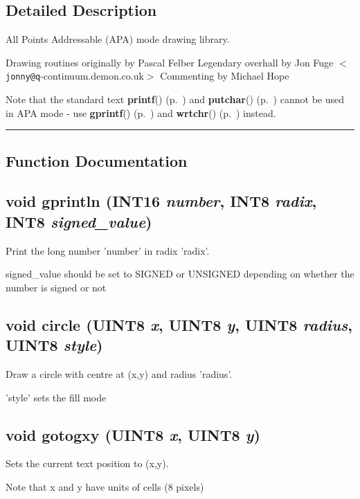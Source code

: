 \subsection*{Detailed Description}
All Points Addressable (APA) mode drawing library.

Drawing routines originally by Pascal Felber Legendary overhall by Jon Fuge $<${\tt jonny@q}-continuum.demon.co.uk$>$ Commenting by Michael Hope

Note that the standard text {\bf printf}() {\rm (p.~\pageref{stdio.h_a1})} and {\bf putchar}() {\rm (p.~\pageref{stdio.h_a0})} cannot be used in APA mode - use {\bf gprintf}() {\rm (p.~\pageref{drawing.h_a17})} and {\bf wrtchr}() {\rm (p.~\pageref{drawing.h_a26})} instead. \vspace{0.4cm}\hrule\vspace{0.2cm}
\subsection*{Function Documentation}
\label{drawing.h_a15}
\subsection{\setlength{\rightskip}{0pt plus 5cm}void gprintln ({\bf INT16} {\em number}, {\bf INT8} {\em radix}, {\bf INT8} {\em signed\_\-value})}

Print the long number 'number' in radix 'radix'.

signed\_\-value should be set to SIGNED or UNSIGNED depending on whether the number is signed or not \label{drawing.h_a24}
\subsection{\setlength{\rightskip}{0pt plus 5cm}void circle ({\bf UINT8} {\em x}, {\bf UINT8} {\em y}, {\bf UINT8} {\em radius}, {\bf UINT8} {\em style})}

Draw a circle with centre at (x,y) and radius 'radius'.

'style' sets the fill mode \label{drawing.h_a27}
\subsection{\setlength{\rightskip}{0pt plus 5cm}void gotogxy ({\bf UINT8} {\em x}, {\bf UINT8} {\em y})}

Sets the current text position to (x,y).

Note that x and y have units of cells (8 pixels) 